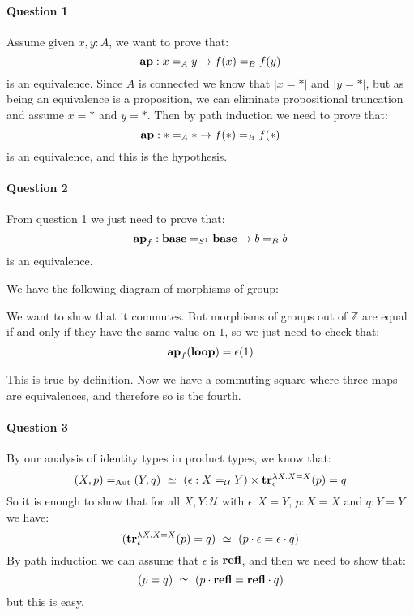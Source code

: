\documentclass{article}[6pt]%
\newcommand{\tr}{\mathrm{\bf tr}}
\newcommand{\refl}{\mathrm{\bf refl}}
\begin{document}
\paragraph{Question 1} 
Assume given $x,y:A$, we want to prove that:
\[\mathrm{\bf ap} : x=_Ay \rightarrow f(x)=_Bf(y)\]
is an equivalence. Since $A$ is connected we know that $|x=*|$ and $|y=*|$, but as being an equivalence is a proposition, we can eliminate propositional truncation and assume $x=*$ and $y=*$. Then by path induction we need to prove that:
\[\mathrm{\bf ap} : *=_A* \rightarrow f(*)=_Bf(*)\]
is an equivalence, and this is the hypothesis.


\paragraph{Question 2}
 From question 1 we just need to prove that:
\[\mathrm{\bf ap}_f : \mathrm{\bf base} =_{S^1}\mathrm{\bf base} \rightarrow  b=_Bb\]
is an equivalence.

We have the following diagram of morphisms of group:

\begin{center}
\end{center}

We want to show that it commutes. But morphisms of groups out of $\mathbb{Z}$ are equal if and only if they have the same value on $1$, so we just need to check that:
\[\mathrm{\bf ap}_f(\mathrm{\bf loop}) = \epsilon(1)\]

This is true by definition. Now we have a commuting square where three maps are equivalences, and therefore so is the fourth. 


\paragraph{Question 3} 
By our analysis of identity types in product types, we know that:
\[(X,p) =_{\mathrm{Aut}}(Y,q) \ \simeq\ (\epsilon : X=_{\mathcal U} Y)\times \tr^{\lambda X.X=X}_\epsilon(p) = q \]
So it is enough to show that for all $X,Y:{\mathcal U}$ with $\epsilon:X=Y$, $p:X=X$ and $q:Y=Y$ we have:
\[ (\tr^{\lambda X.X=X}_\epsilon(p) = q)\ \simeq \ (p\cdot \epsilon = \epsilon\cdot q)\]
By path induction we can assume that $\epsilon$ is $\refl$, and then we need to show that:
\[(p=q)\ \simeq\ (p\cdot\refl = \refl\cdot q) \]
but this is easy.
\end{document}
